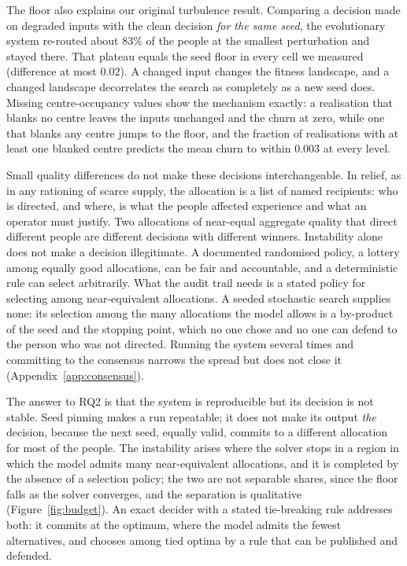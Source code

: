 \documentclass[systems,article,submit,moreauthors,pdftex]{Definitions/mdpi}
\begin{document}
The floor also explains our original turbulence result. Comparing a decision made on
degraded inputs with the clean decision \emph{for the same seed}, the evolutionary system
re-routed about $83\%$ of the people at the smallest perturbation and stayed there. That
plateau equals the seed floor in every cell we measured (difference at most $0.02$). A changed
input changes the fitness landscape, and a changed landscape decorrelates the search as
completely as a new seed does. Missing centre-occupancy values show the mechanism exactly:
a realisation that blanks no centre leaves the inputs unchanged and the churn at zero, while
one that blanks any centre jumps to the floor, and the fraction of realisations with at
least one blanked centre predicts the mean churn to within $0.003$ at every level.

Small quality differences do not make these decisions interchangeable. In relief, as in any
rationing of scarce supply, the allocation is a list of named recipients: who is directed,
and where, is what the people affected experience and what an operator must justify. Two
allocations of near-equal aggregate quality that direct different people are different
decisions with different winners. Instability alone does not make a decision illegitimate. A
documented randomised policy, a lottery among equally good allocations, can be fair and
accountable, and a deterministic rule can select arbitrarily. What the audit trail needs is a
stated policy for selecting among near-equivalent allocations. A seeded stochastic search
supplies none: its selection among the many allocations the model allows is a by-product of
the seed and the stopping point, which no one chose and no one can defend to the person who was
not directed. Running the system several times and committing to the consensus narrows the
spread but does not close it (Appendix~\ref{app:consensus}).

The answer to RQ2 is that the system is reproducible but its decision is not stable. Seed
pinning makes a run repeatable; it does not make its output \emph{the} decision, because the
next seed, equally valid, commits to a different allocation for most of the people. The
instability arises where the solver stops in a region in which the model admits many
near-equivalent allocations, and it is completed by the absence of a selection policy; the two
are not separable shares, since the floor falls as the solver converges, and the separation is qualitative (Figure~\ref{fig:budget}). An exact decider with a stated
tie-breaking rule addresses both: it commits at the optimum, where the model admits the fewest
alternatives, and chooses among tied optima by a rule that can be published and defended.
\end{document}
